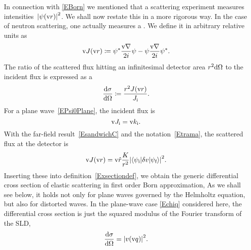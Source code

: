 In connection with \cref{EBorn} we mentioned
that a scattering experiment measures intensities~${|\psi(\text{v}{r})|}^2$.
We shall now restate this in a more rigorous way.
In the case of neutron scattering,
one actually measures a .
We define it in arbitrary relative units as
\begin{equation}\label{EdefJ}
  \text{v}{J}(\text{v}{r}) \coloneqq  \psi^*\frac{\text{v}{\nabla}}{2i}\psi - \psi\frac{\text{v}{\nabla}}{2i}\psi^*.
\end{equation}
%
%
The ratio of the scattered flux hitting an infinitesimal detector area
$r^2\mathrm d\Omega$ to the incident flux is expressed as a
%
%
%
\begin{equation}\label{Exsectiondef}
  \frac{\mathrm d\sigma}{\mathrm d\Omega}
  \coloneqq  \frac{r^2 J(\text{v}{r})}{J_{\text{i}}}.
\end{equation}
%
%
For a plane wave~\cref{EPsi0Plane}, the incident flux is
%
%
\begin{equation}\label{EJi}
  \text{v}{J}_{\text{i}} = \text{v}{k}_{\text{i}}.
\end{equation}
With the far-field result~\cref{EsandwichC}
and the notation~\cref{Etrama},
the scattered flux at the detector is
\begin{equation}\label{EJr}
  \text{v}{J}(\text{v}{r})
  = \text{v}{\hat r}\frac{K}{r^2}
    {\left|\left\langle\psi_{\text{i}}|\delta v|\psi_{\text{f}}\right\rangle\right|}^2.
\end{equation}
%
Inserting these into definition~\cref{Exsectiondef},
we obtain the generic differential cross section
of elastic scattering in first order Born approximation,
%
%
%
As we shall see below,
it holds not only for plane waves governed
by the Helmholtz equation,
but also for distorted waves.
%
In the plane-wave case \cref{Echiq} considered here,
the differential cross section is just the squared modulus
of the Fourier transform of the SLD,
%
\begin{equation}\label{Ecross1}
  \frac{\mathrm d\sigma}{\mathrm d\Omega}
  = {\left| v(\text{v}{q}) \right|}^2.
\end{equation}

